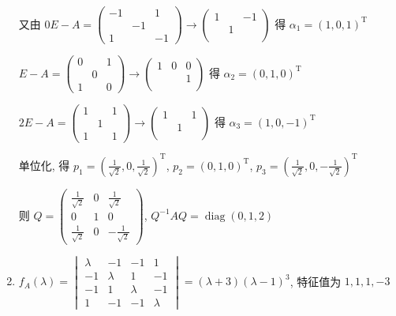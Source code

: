 \begin{enumerate}
			       又由 \( 0E-A = \begin{pmatrix}
				       -1 &    & 1  \\
				          & -1 &    \\
				       1  &    & -1
			       \end{pmatrix} \rightarrow \begin{pmatrix}
				       1 &   & -1 \\
				         & 1 &    \\
				         &   &
			       \end{pmatrix} \) 得 \( \alpha_{1} = (1, 0, 1)^{\mathrm{T}} \)

			       \( E-A = \begin{pmatrix}
				       0 &   & 1 \\
				         & 0 &   \\
				       1 &   & 0
			       \end{pmatrix} \rightarrow \begin{pmatrix}
				       1 & 0 & 0 \\
				         &   & 1 \\
				         &   &
			       \end{pmatrix} \) 得 \( \alpha_{2} = (0, 1, 0)^{\mathrm{T}} \)

			       \( 2E-A = \begin{pmatrix}
				       1 &   & 1 \\
				         & 1 &   \\
				       1 &   & 1
			       \end{pmatrix} \rightarrow \begin{pmatrix}
				       1 &   & 1 \\
				         & 1 &   \\
				         &   &
			       \end{pmatrix} \) 得 \( \alpha_{3} = (1, 0, -1)^{\mathrm{T}} \)

			       单位化, 得 \( p_{1} = \left( \frac{1}{\sqrt{2}}, 0, \frac{1}{\sqrt{2}} \right)^{\mathrm{T}} \), \( p_{2} = (0, 1, 0)^{\mathrm{T}} \), \( p_{3} = \left( \frac{1}{\sqrt{2}}, 0, -\frac{1}{\sqrt{2}} \right)^{\mathrm{T}} \)

			       则 \( Q = \begin{pmatrix}
				       \frac{1}{\sqrt{2}} & 0 & \frac{1}{\sqrt{2}}  \\
				       0                  & 1 & 0                   \\
				       \frac{1}{\sqrt{2}} & 0 & -\frac{1}{\sqrt{2}}
			       \end{pmatrix} \), \( Q^{-1}AQ = \operatorname{diag}(0, 1, 2) \)
			 \item %
			       \( f_{A}(\lambda) = \begin{vmatrix}
				       \lambda & -1      & -1      & 1       \\
				       -1      & \lambda & 1       & -1      \\
				       -1      & 1       & \lambda & -1      \\
				       1       & -1      & -1      & \lambda
			       \end{vmatrix} = (\lambda+3)(\lambda-1)^{3} \), 特征值为 \( 1, 1, 1, -3 \)


\end{enumerate}
